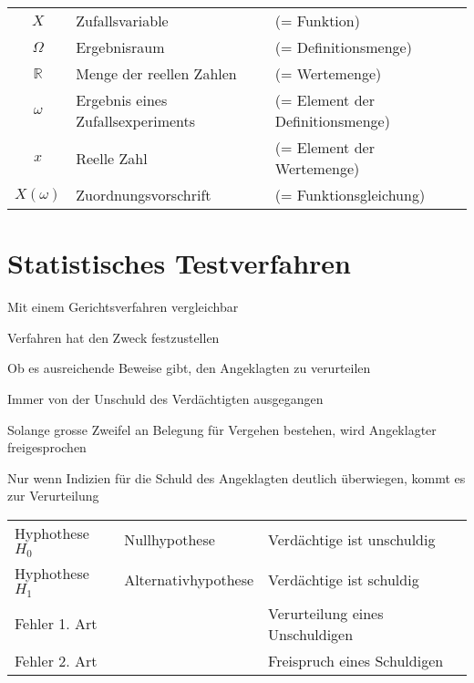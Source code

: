 \documentclass[
	final,
	a4paper,
	oneside,
	parskip=full,
	headings=standardclasses,
	headings=big,
	pointednumbers
]{scrartcl}
\newcommand{\kl}[1]{{\left( #1 \right)}}
\begin{document}
    \begin{tabular}{cll}
        $X$             & Zufallsvariable                   & (= Funktion) \\
        $\Omega$        & Ergebnisraum                      & (= Definitionsmenge) \\
        $\mathbb{R}$    & Menge der reellen Zahlen          & (= Wertemenge) \\
        $\omega$        & Ergebnis eines Zufallsexperiments & (= Element der Definitionsmenge) \\
        $x$             & Reelle Zahl                       & (= Element der Wertemenge) \\
        $X\kl{\omega}$  & Zuordnungsvorschrift              & (= Funktionsgleichung) \\
    \end{tabular}

    \section{Statistisches Testverfahren}

    \begin{tabenum}
        \item{Mit einem Gerichtsverfahren vergleichbar}
        \item{Verfahren hat den Zweck festzustellen}
        \begin{tabenum}
            \item{Ob es ausreichende Beweise gibt, den Angeklagten zu verurteilen}
            \item{Immer von der Unschuld des Verdächtigten ausgegangen}
            \item{Solange grosse Zweifel an Belegung für Vergehen bestehen, wird Angeklagter freigesprochen}
            \item{Nur wenn Indizien für die Schuld des Angeklagten deutlich überwiegen, kommt es zur Verurteilung}
        \end{tabenum}
    \end{tabenum}

    \begin{tabular}{lll}
        Hyphothese $H_0$ & Nullhypothese       & Verdächtige ist unschuldig \\
        Hyphothese $H_1$ & Alternativhypothese & Verdächtige ist schuldig \\
        Fehler 1. Art    &                     & Verurteilung eines Unschuldigen \\
        Fehler 2. Art    &                     & Freispruch eines Schuldigen \\
    \end{tabular}
    
\end{document}
